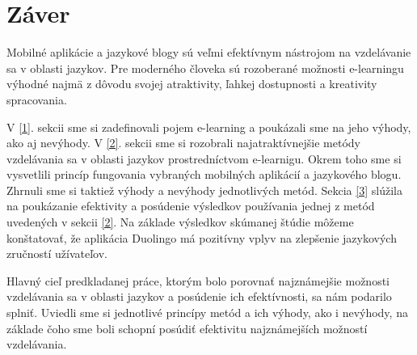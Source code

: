 \documentclass[10pt,oneside,slovak,a4paper]{article}
\begin{document}
\section*{Záver}
Mobilné aplikácie a jazykové blogy sú veľmi efektívnym nástrojom na vzdelávanie sa v oblasti jazykov. Pre moderného človeka sú rozoberané možnosti e-learningu výhodné najmä z dôvodu svojej atraktivity, ľahkej dostupnosti a kreativity spracovania.

V \ref{1}. sekcii sme si zadefinovali pojem e-learning a poukázali sme na jeho výhody, ako aj nevýhody. V \ref{2}. sekcii sme si rozobrali najatraktívnejšie metódy vzdelávania sa v oblasti jazykov prostredníctvom e-learnigu. Okrem toho sme si vysvetlili princíp fungovania vybraných mobilných aplikácií a jazykového blogu. Zhrnuli sme si taktiež výhody a nevýhody jednotlivých metód. Sekcia \ref{3} slúžila na poukázanie efektivity a posúdenie výsledkov používania jednej z metód uvedených v sekcii \ref{2}. Na základe výsledkov skúmanej štúdie môžeme konštatovať, že aplikácia Duolingo má pozitívny vplyv na zlepšenie jazykových zručností užívateľov. 

Hlavný cieľ predkladanej práce, ktorým bolo porovnať najznámejšie možnosti vzdelávania sa v oblasti jazykov a posúdenie ich efektívnosti, sa nám podarilo splniť. Uviedli sme si jednotlivé princípy metód a ich výhody, ako i nevýhody, na základe čoho sme boli schopní posúdiť efektivitu najznámejších možností vzdelávania.



\end{document}
